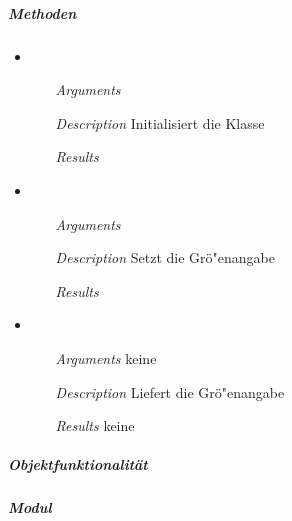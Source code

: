 \subparagraph{Methoden}
\begin{itemize}

\item {}
\begin{enumerate}
\item[\textit{Arguments}] 
\item[\textit{Description}] Initialisiert die Klasse
\item[\textit{Results}] 
\end{enumerate}

\item {}
\begin{enumerate}
\item[\textit{Arguments}] 
\item[\textit{Description}] Setzt die Gr\"o"enangabe
\item[\textit{Results}] 
\end{enumerate}

\item {}
\begin{enumerate}
\item[\textit{Arguments}] keine
\item[\textit{Description}] Liefert die Gr\"o"enangabe
\item[\textit{Results}] keine
\end{enumerate}

\end{itemize}


\newpage

\subparagraph{Objektfunktionalit\"at}


\newpage

\paragraph{}

\subparagraph{Modul} 


